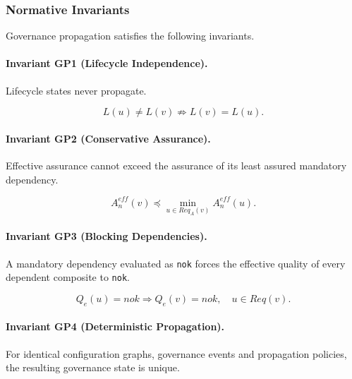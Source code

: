 \documentclass[10pt]{article}
\begin{document}
\subsubsection{Normative Invariants}

Governance propagation satisfies the following invariants.

\paragraph{Invariant GP1 (Lifecycle Independence).}

Lifecycle states never propagate.

\begin{equation}
	L(u)\neq L(v)
	\not\Rightarrow
	L(v)=L(u).
	\label{eq:gp1}
\end{equation}

\paragraph{Invariant GP2 (Conservative Assurance).}

Effective assurance cannot exceed the assurance of its least assured mandatory
dependency.

\begin{equation}
	A_n^{eff}(v)
	\preceq
	\min_{u\in Req_A(v)}
	A_n^{eff}(u).
	\label{eq:gp2}
\end{equation}

\paragraph{Invariant GP3 (Blocking Dependencies).}

A mandatory dependency evaluated as
\texttt{nok}
forces the effective quality of every dependent composite to
\texttt{nok}.

\begin{equation}
	Q_e(u)=nok
	\Longrightarrow
	Q_e(v)=nok,
	\quad
	u\in Req(v).
	\label{eq:gp3}
\end{equation}

\paragraph{Invariant GP4 (Deterministic Propagation).}

For identical configuration graphs, governance events and propagation policies,
the resulting governance state is unique.
\end{document}
